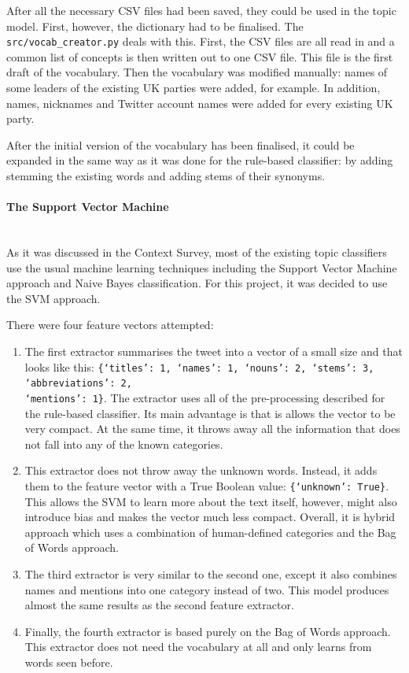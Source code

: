 After all the necessary CSV files had been saved, they could be used in the topic model. First, however, the dictionary had to be finalised. The \texttt{src/vocab\_creator.py} deals with this. First, the CSV files are all read in and a common list of concepts is then written out to one CSV file. This file is the first draft of the vocabulary. Then the vocabulary was modified manually: names of some leaders of the existing UK parties were added, for example. In addition, names, nicknames and Twitter account names were added for every existing UK party. 

After the initial version of the vocabulary has been finalised, it could be expanded in the same way as it was done for the rule-based classifier: by adding stemming the existing words and adding stems of their synonyms.

\paragraph{The Support Vector Machine}\mbox{}\\
As it was discussed in the Context Survey, most of the existing topic classifiers use the usual machine learning techniques including the Support Vector Machine approach and Naive Bayes classification. For this project, it was decided to use the SVM approach. 

There were four feature vectors attempted:
\begin{enumerate}
    \item The first extractor summarises the tweet into a vector of a small size and that looks like this: \texttt{\{`titles': 1, `names': 1, `nouns': 2, `stems': 3, `abbreviations': 2,\\ `mentions': 1\}}. The extractor uses all of the pre-processing described for the rule-based classifier. Its main advantage is that is allows the vector to be very compact. At the same time, it throws away all the information that does not fall into any of the known categories. 
    \item This extractor does not throw away the unknown words. Instead, it adds them to the feature vector with a True Boolean value: \texttt{\{`unknown': True\}}. This allows the SVM to learn more about the text itself, however, might also introduce bias and makes the vector much less compact. Overall, it is hybrid approach which uses a combination of human-defined categories and the Bag of Words approach.
    \item The third extractor is very similar to the second one, except it also combines names and mentions into one category instead of two. This model produces almost the same results as the second feature extractor.
    \item Finally, the fourth extractor is based purely on the Bag of Words approach. This extractor does not need the vocabulary at all and only learns from words seen before. 
\end{enumerate}

